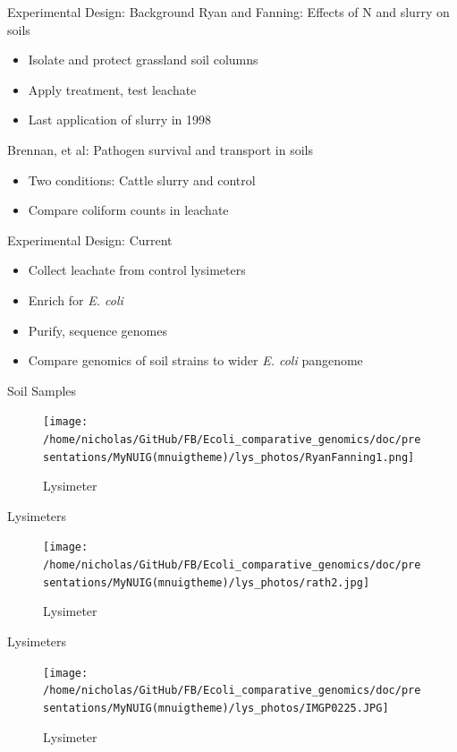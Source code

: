 \documentclass[17pt,aspectratio=169]{beamer}
\begin{document}
\begin{frame}[label=sec-5]{Experimental Design: Background}
Ryan and Fanning: Effects of N and slurry on soils
\begin{itemize}
\item Isolate and protect grassland soil columns
\item Apply treatment, test leachate
\item Last application of slurry in 1998
\end{itemize}
Brennan, et al: Pathogen survival and transport in soils
\begin{itemize}
\item Two conditions: Cattle slurry and  control
\item Compare coliform counts in leachate
\end{itemize}
\end{frame}
\begin{frame}[label=sec-6]{Experimental Design: Current}
\begin{itemize}
\item Collect leachate from control lysimeters
\item Enrich for \emph{E. coli}
\item Purify, sequence genomes
\item Compare genomics of soil strains to wider \emph{E. coli} pangenome
\end{itemize}
\end{frame}

\begin{frame}[label=sec-7]{Soil Samples}
\begin{figure}[htb]
\centering
\texttt{[image: /home/nicholas/GitHub/FB/Ecoli\_comparative\_genomics/doc/presentations/MyNUIG(mnuigtheme)/lys\_photos/RyanFanning1.png]}
\caption{\label{fig:lys3}Lysimeter}
\end{figure}
\footnotemark[1]{}
\end{frame}

\begin{frame}[label=sec-8]{Lysimeters}
\begin{figure}[htb]
\centering
\texttt{[image: /home/nicholas/GitHub/FB/Ecoli\_comparative\_genomics/doc/presentations/MyNUIG(mnuigtheme)/lys\_photos/rath2.jpg]}
\caption{\label{fig:lys1}Lysimeter}
\end{figure}
\end{frame}

\begin{frame}[label=sec-9]{Lysimeters}
\begin{figure}[htb]
\centering
\texttt{[image: /home/nicholas/GitHub/FB/Ecoli\_comparative\_genomics/doc/presentations/MyNUIG(mnuigtheme)/lys\_photos/IMGP0225.JPG]}
\caption{\label{fig:lys2}Lysimeter}
\end{figure}
\end{frame}
\end{document}
